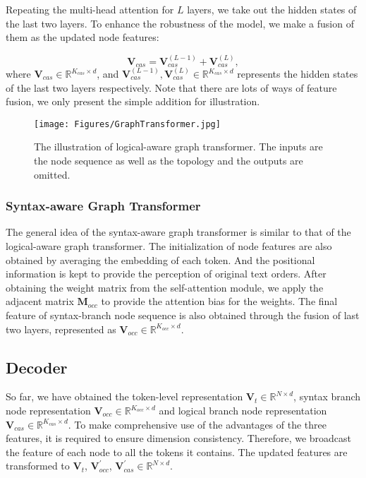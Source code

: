 \documentclass[sigconf]{acmart}
\begin{document}
Repeating the multi-head attention for $L$ layers, we take out the hidden states of the last two layers. To enhance the robustness of the model, we make a fusion of them as the updated node features:

\begin{equation}
	\mathbf{V}_{cas} = \mathbf{V}_{cas}^{(L-1)} + \mathbf{V}_{cas}^{(L)},
\end{equation}
where $\mathbf{V}_{cas} \in \mathbb{R}^{K_{cas}\times d}$, and $\mathbf{V}_{cas}^{(L-1)}, \mathbf{V}_{cas}^{(L)} \in \mathbb{R}^{K_{cas}\times d}$ represents the hidden states of the last two layers respectively. Note that there are lots of ways of feature fusion, we only present the simple addition for illustration. 

\begin{figure}[t]
	\large
	\centering
	\texttt{[image: Figures/GraphTransformer.jpg]}
	\vspace{-0.2cm}
	\caption{The illustration of logical-aware graph transformer. The inputs are the node sequence as well as the topology and the outputs are omitted.}
	\label{transformer}
	\vspace{-0.3cm}
\end{figure}


\subsubsection{\textbf{Syntax-aware Graph Transformer}}
The general idea of the syntax-aware graph transformer is similar to that of the logical-aware graph transformer. The initialization of node features are also obtained by averaging the embedding of each token. And the positional information is kept to provide the perception of original text orders. After obtaining the weight matrix from the self-attention module, we apply the adjacent matrix $\mathbf{M}_{occ}$ to provide the attention bias for the weights. The final feature of syntax-branch node sequence is also obtained through the fusion of last two layers, represented as $\mathbf{V}_{occ} \in \mathbb{R}^{K_{occ} \times d}$.

\subsection{Decoder}
So far, we have obtained the token-level representation $\mathbf{V}_{t} \in \mathbb{R}^{N \times d}$, syntax branch node representation $\mathbf{V}_{occ} \in \mathbb{R}^{K_{occ} \times d}$ and logical branch node representation $\mathbf{V}_{cas} \in \mathbb{R}^{K_{cas} \times d}$. To make comprehensive use of the advantages of the three features, it is required to ensure dimension consistency. Therefore, we broadcast the feature of each node to all the tokens it contains. The updated features are transformed to $\mathbf{V}_{t}$, $\mathbf{V}_{occ}^{'}$, $\mathbf{V}_{cas}^{'} \in \mathbb{R}^{N \times d}$.
\end{document}
